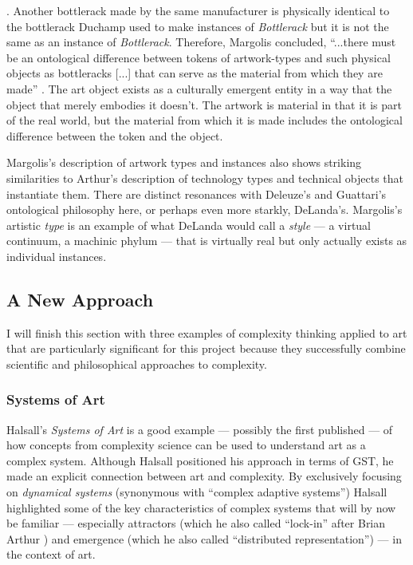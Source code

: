 {        }. Another bottlerack made by the same manufacturer is physically identical to the bottlerack Duchamp used to make instances of \emph{Bottlerack} but it is not the same as an instance of \emph{Bottlerack}. Therefore, Margolis concluded, “...there must be an ontological difference between tokens of artwork-types and such physical objects as bottleracks [...] that can serve as the material from which they are made” \cite[p.21]{MargolisArtPhlsphy1984}. The art object exists as a culturally emergent entity in a way that the object that merely embodies it doesn't. The artwork is material in that it is part of the real world, but the material from which it is made includes the ontological difference between the token and the object.
        
        Margolis's description of artwork types and instances also shows striking similarities to Arthur's description of technology types and technical objects that instantiate them. There are distinct resonances with Deleuze's and Guattari's ontological philosophy here, or perhaps even more starkly, DeLanda's. Margolis's artistic \emph{type} is an example of what DeLanda would call a \emph{style} — a virtual continuum, a machinic phylum — that is virtually real but only actually exists as individual instances. 

        \subsection{A New Approach}\label{sec:AnNewApproach}

            I will finish this section with three examples of complexity thinking applied to art that are particularly significant for this project because they successfully combine scientific and philosophical approaches to complexity.

            \subsubsection{Systems of Art}\label{sec:SystemsOfArt}

                Halsall's \emph{Systems of Art} is a good example — possibly the first published — of how concepts from complexity science can be used to understand art as a complex system. Although Halsall positioned his approach in terms of GST, he made an explicit connection between art and complexity. By exclusively focusing on \emph{dynamical systems} \citep[p.35]{HalsallSystmsOfArt2008} (synonymous with “complex adaptive systems”) Halsall highlighted some of the key characteristics of complex systems that will by now be familiar — especially attractors (which he also called “lock-in” after Brian Arthur \citep[pp.74-77]{HalsallSystmsOfArt2008}) and emergence (which he also called “distributed representation”\citep[pp.80-84]{HalsallSystmsOfArt2008}) — in the context of art.

